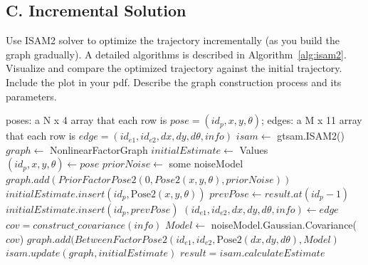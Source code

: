 \documentclass[tp]{lcc}
\begin{document}
\subsection{C. Incremental Solution}
\label{sec:incremental_solution}
Use ISAM2 solver to optimize the trajectory incrementally (as you build the graph gradually). A detailed algorithms is described in Algorithm~\ref{alg:isam2}. Visualize and compare the optimized trajectory against the initial trajectory. Include the plot in your pdf. Describe the graph construction process and its parameters.

\begin{algorithm}
    \caption{\lstinline[style=bash]{incremental_solution_2d(poses, edges)}}
    \label{alg:isam2}
    \begin{algorithmic}[1]    
    \Require poses: a N x 4 array that each row is $pose=(id_{p},x,y,\theta)$; edges: a M x 11 array that each row is $edge=(id_{e1},id_{e2},dx,dy,d\theta,info)$
    \State $isam \leftarrow$ gtsam.ISAM2() 
        \State $graph \leftarrow$ NonlinearFactorGraph 
        \State $initialEstimate \leftarrow$ Values 
        \State $(id_{p},x,y,\theta) \gets pose$ 
            \State $priorNoise \leftarrow$ some noiseModel 
            \State $graph.add(PriorFactorPose2(0,Pose2(x,y,\theta),priorNoise))$
            \State $initialEstimate.insert(id_{p},\text{Pose2}(x,y,\theta))$
        \Else {}
            \State $prevPose \gets result.at(id_{p}-1)$ 
            \State $initialEstimate.insert(id_{p},prevPose)$
        \EndIf
            \State $(id_{e1},id_{e2},dx,dy,d\theta,info) \gets edge$ 
                \State $cov=construct\_covariance(info)$ 
                \State $Model \leftarrow$ noiseModel.Gaussian.Covariance($cov$)
                \State $graph.add(BetweenFactorPose2(id_{e1},id_{e2},\text{Pose2}(dx,dy,d\theta),Model)$
            \EndIf
        \EndFor
        \State $isam.update(graph,initialEstimate)$
        \State $result=isam.calculateEstimate$
    \EndFor
    \end{algorithmic}
\end{algorithm}
\end{document}
